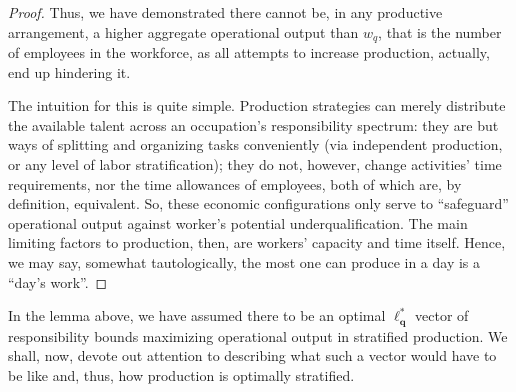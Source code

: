 \documentclass[hidelinks, nonatbib]{elsarticle}
\begin{document}
\begin{lemma}
\begin{proof}
        Thus, we have demonstrated there cannot be, in any productive arrangement, a higher aggregate operational output than $w_q$, that is the number of employees in the workforce, as all attempts to increase production, actually, end up hindering it. 
        
        The intuition for this is quite simple. Production strategies can merely distribute the available talent across an occupation's responsibility spectrum: they are but ways of splitting and organizing tasks conveniently (via independent production, or any level of labor stratification); they do not, however, change activities' time requirements, nor the time allowances of employees, both of which are, by definition, equivalent. So, these economic configurations only serve to ``safeguard'' operational output against worker's potential underqualification. The main limiting factors to production, then, are workers' capacity and time itself. Hence, we may say, somewhat tautologically, the most one can produce in a day is a ``day's work''.
    \end{proof}
\end{lemma}

In the lemma above, we have assumed there to be an optimal $\boldsymbol{\ell_{q}^{*}}$ vector of responsibility bounds maximizing operational output in stratified production. We shall, now, devote out attention to describing what such a vector would have to be like and, thus, how production is optimally stratified.
\end{document}
